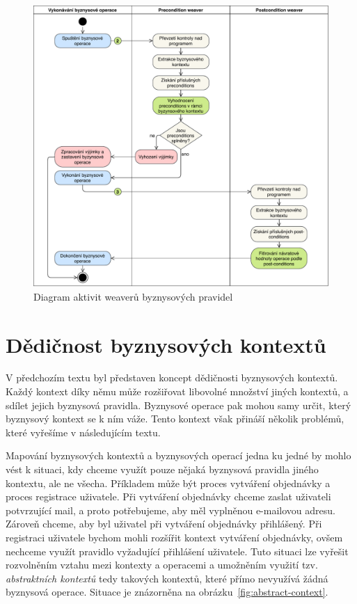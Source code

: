 \begin{figure}
    \centering
    \includegraphics[keepaspectratio=true, width=0.8\linewidth]{figures/business-rules-weaver.pdf}
    \caption{Diagram aktivit weaverů byznysov\'ych pravidel}
    \label{fig:business-rules-weaver}
\end{figure} %

\section{Dědičnost byznysových kontextů}\label{sec:context-inheritance}

V předchozím textu byl představen koncept dědičnosti byznysových kontextů.
Každý kontext díky němu může rozšiřovat libovolné množství jiných kontextů, a sdílet jejich
byznysová pravidla. Byznysové operace pak mohou samy určit, který byznysový kontext se k ním váže.
Tento kontext však přináší několik problémů, které vyřešíme v následujícím textu.

Mapování byznysových kontextů a byznysových operací jedna ku jedné by mohlo vést k situaci,
kdy chceme využít pouze nějaká byznysová pravidla jiného kontextu, ale ne všecha.
Příkladem může být proces vytváření objednávky a proces registrace uživatele.
Při vytváření objednávky chceme zaslat uživateli potvrzující mail, a proto potřebujeme, aby
měl vyplněnou e-mailovou adresu. Zároveň chceme, aby byl uživatel při vytváření objednávky přihlášený.
Při registraci uživatele bychom mohli rozšířit kontext vytváření objednávky, ovšem nechceme využít pravidlo
vyžadující přihlášení uživatele. Tuto situaci lze vyřešit rozvolněním vztahu mezi kontexty a operacemi
a umožněním využití tzv. \textit{abstraktních kontextů} \textendash\xspace tedy takových kontextů, které
přímo nevyužívá žádná byznysová operace. Situace je znázorněna na obrázku~\ref{fig:abstract-context}.

